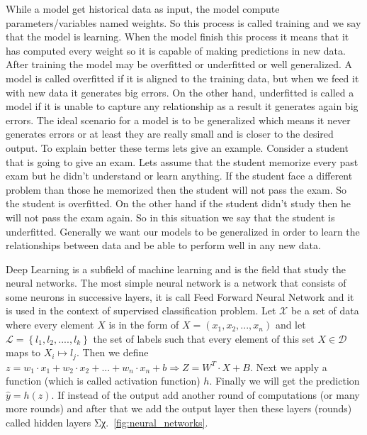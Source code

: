 \documentclass[a4paper,12pt]{report}
\theoremstyle{definitionNODot}
\begin{document}
	While a model get historical data as input, the model compute parameters/variables named weights. So this process is called training and we say that the model is learning. When the model finish this process it means that it has computed every weight so it is capable of making predictions in new data. After training the model may be overfitted or underfitted or well generalized. A model is called overfitted if it is aligned to the training data, but when we feed it with new data it generates big errors. On the other hand, underfitted is called a model if it is unable to capture any relationship as a result it generates again big errors. The ideal scenario for a model is to be generalized which means it never generates errors or at least they are really small and is closer to the desired output. To explain better these terms lets give an example. Consider a student that is going to give an exam. Lets assume that the student memorize every past exam but he didn't understand or learn anything. If the student face a different problem than those he memorized then the student will not pass the exam. So the student is overfitted. On the other hand if the student didn't study then he will not pass the exam again. So in this situation we say that the student is underfitted. Generally we want our models to be generalized in order to learn the relationships between data and be able to perform well in any new data. 
	
	Deep Learning is a subfield of machine learning and is the field that study the neural networks. The most simple neural network is a network that consists of some neurons in successive layers, it is call Feed Forward Neural Network and it is used in the context of supervised classification problem. Let $\mathcal{X}$ be a set of data where every element $X$ is in the form of $X=(x_1,x_2,...,x_n)$ and let $\mathcal{L}=\left \{l_1,l_2,....,l_k \right \}$ the set of labels such that every element of this set $X\in\mathcal{D}$ maps to $X_i \mapsto l_j$. Then we define $z=w_1\cdot x_1 + w_2\cdot x_2 +...+w_n\cdot x_n + b \Rightarrow Z = W^T \cdot X + B$. Next we apply a function (which is called activation function) $h$. Finally we will get the prediction $\hat{y} = h(z)$. If instead of the output add another round of computations (or many more rounds) and after that we add the output layer then these layers (rounds) called hidden layers Σχ.~\ref{fig:neural_networks}. 
	
\end{document}
